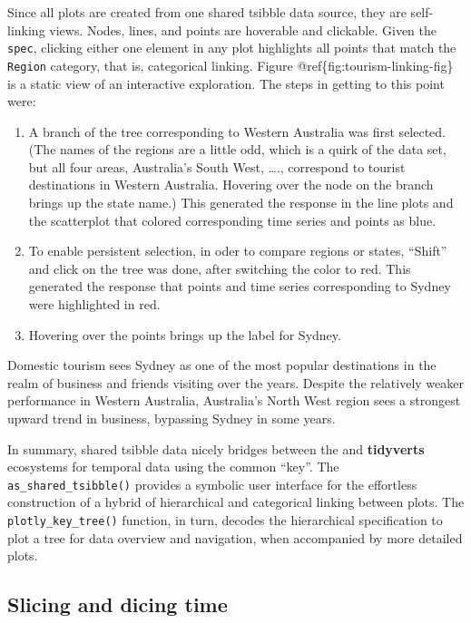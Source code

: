 Since all plots are created from one shared tsibble data source, they
are self-linking views. Nodes, lines, and points are hoverable and
clickable. Given the \texttt{spec}, clicking either one element in any
plot highlights all points that match the \texttt{Region} category, that
is, categorical linking. Figure @ref\{fig:tourism-linking-fig\} is a
static view of an interactive exploration. The steps in getting to this
point were:

\begin{enumerate}
\def\labelenumi{\arabic{enumi}.}
\tightlist
\item
  A branch of the tree corresponding to Western Australia was first
  selected. (The names of the regions are a little odd, which is a quirk
  of the data set, but all four areas, Australia's South West, \ldots.,
  correspond to tourist destinations in Western Australia. Hovering over
  the node on the branch brings up the state name.) This generated the
  response in the line plots and the scatterplot that colored
  corresponding time series and points as blue.
\item
  To enable persistent selection, in oder to compare regions or states,
  ``Shift'' and click on the tree was done, after switching the color to
  red. This generated the response that points and time series
  corresponding to Sydney were highlighted in red.
\item
  Hovering over the points brings up the label for Sydney.
\end{enumerate}

Domestic tourism sees Sydney as one of the most popular destinations in
the realm of business and friends visiting over the years. Despite the
relatively weaker performance in Western Australia, Australia's North
West region sees a strongest upward trend in business, bypassing Sydney
in some years.

In summary, shared tsibble data nicely bridges between the
 and \textbf{tidyverts} ecosystems for temporal data
using the common ``key''. The \texttt{as\_shared\_tsibble()} provides a
symbolic user interface for the effortless construction of a hybrid of
hierarchical and categorical linking between plots. The
\texttt{plotly\_key\_tree()} function, in turn, decodes the hierarchical
specification to plot a tree for data overview and navigation, when
accompanied by more detailed plots.

\hypertarget{slicing-and-dicing-time}{%
\subsection{Slicing and dicing time}\label{slicing-and-dicing-time}}

